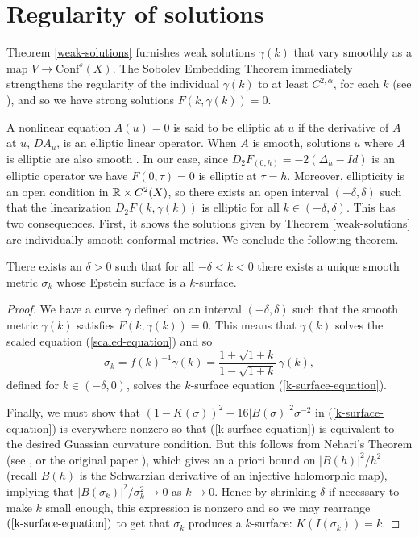 \section{Regularity of solutions}
\label{regularity}


Theorem \ref{weak-solutions} furnishes weak solutions $\gamma(k)$ that vary smoothly as a map $V \to \mathrm{Conf}^s(X)$. 
The Sobolev Embedding Theorem immediately strengthens the regularity of the individual $\gamma(k)$ to at least $C^{2,\alpha}$, for each $k$ (see \cite{aubin1982}), and so we have strong solutions $F(k,\gamma(k)) = 0$.

 
A nonlinear equation $A(u) = 0$ is said to be elliptic at $u$ if the derivative of $A$ at $u$, $DA_u$, is an elliptic linear operator. 
When $A$ is smooth, solutions $u$ where $A$ is elliptic are also smooth \cite[Lemma 17.16]{gilbarg-trudinger2001}. 
In our case, since $D_2F_{(0,h)} = -2(\Delta_h - Id)$ is an elliptic operator we have $F(0, \tau) = 0$ is elliptic at $\tau = h$. 
Moreover, ellipticity is an open condition in $\mathbb{R} \times C^2(X)$, so there exists an open interval $(-\delta,\delta)$ such that the linearization $D_2F(k,\gamma(k))$ is elliptic for all $k \in (-\delta,\delta)$.
This has two consequences.
First, it shows the solutions given by Theorem \ref{weak-solutions} are individually smooth conformal metrics.
We conclude the following theorem.

\begin{thm}
\label{k-surfaces-existence}
There exists an $\delta > 0$ such that for all $-\delta < k < 0$ there exists a unique smooth metric $\sigma_k$ whose Epstein surface is a $k$-surface.
\end{thm}

\begin{proof}
We have a curve $\gamma$ defined on an interval $(-\delta, \delta)$ such that the smooth metric $\gamma(k)$ satisfies $F(k,\gamma(k)) = 0$. 
This means that $\gamma(k)$ solves the scaled equation (\ref{scaled-equation}) and so 
\[
\sigma_k = f(k)^{-1} \gamma(k) =  \frac{1 + \sqrt{1+k}}{1 - \sqrt{1+k}} \, \gamma(k),
\]
defined for $k \in (-\delta,0)$, solves the $k$-surface equation (\ref{k-surface-equation}). 

Finally, we must show that $(1-K(\sigma))^2 - 16|B(\sigma)|^2\sigma^{-2}$ in (\ref{k-surface-equation}) is everywhere nonzero so that (\ref{k-surface-equation}) is equivalent to the desired Guassian curvature condition.
But this follows from Nehari's Theorem (see \cite[Theorem 1.3]{lehto-1987}, or the original paper \cite{nehari-1949}), which gives an a priori bound on $|B(h)|^2/h^2$ (recall $B(h)$ is the Schwarzian derivative of an injective holomorphic map), implying that $|B(\sigma_k)|^2/\sigma_k^2 \to 0$ as $k \to 0$. 
Hence by shrinking $\delta$ if necessary to make $k$ small enough, this expression is nonzero and so we may rearrange $(\ref{k-surface-equation})$ to get that $\sigma_k$ produces a $k$-surface: $K(I(\sigma_k)) = k$.
\end{proof}

